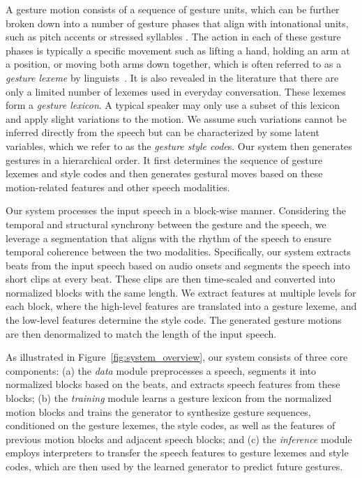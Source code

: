 \documentclass[acmtog,authorversion]{acmart}
\newcommand{\fig}{Figure{}~}
\begin{document}
A gesture motion consists of a sequence of gesture units, which can be further broken down into a number of gesture phases that align with intonational units, such as pitch accents or stressed syllables \cite{kendon2004GestureBook,Loehr2012Temporal}. The action in each of these gesture phases is typically a specific movement such as lifting a hand, holding an arm at a position, or moving both arms down together, which is often referred to as a \emph{gesture lexeme} by linguists~\cite{Neff2008Gesture,Kipp2004_Gesture,Webb1996_Linguistic}. It is also revealed in the literature that there are only a limited number of lexemes used in everyday conversation. These lexemes form a \emph{gesture lexicon}. A typical speaker may only use a subset of this lexicon and apply slight variations to the motion. We assume such variations cannot be inferred directly from the speech but can be characterized by some latent variables, which we refer to as the \emph{gesture style code}s. Our system then generates gestures in a hierarchical order. It first determines the sequence of gesture lexemes and style codes and then generates gestural moves based on these motion-related features and other speech modalities.

Our system processes the input speech in a block-wise manner. Considering the temporal and structural synchrony between the gesture and the speech, we leverage a segmentation that aligns with the rhythm of the speech to ensure temporal coherence between the two modalities. Specifically, our system extracts beats from the input speech based on audio onsets and segments the speech into short clips at every beat. These clips are then time-scaled and converted into normalized blocks with the same length. We extract features at multiple levels for each block, where the high-level features are translated into a gesture lexeme, and the low-level features determine the style code. The generated gesture motions are then denormalized to match the length of the input speech.

As illustrated in \fig\ref{fig:system_overview}, our system consists of three core components: (a) the \emph{data} module preprocesses a speech, segments it into normalized blocks based on the beats, and extracts speech features from these blocks; (b) the \emph{training} module learns a gesture lexicon from the normalized motion blocks and trains the generator to synthesize gesture sequences, conditioned on the gesture lexemes, the style codes, as well as the features of previous motion blocks and adjacent speech blocks; and (c) the \emph{inference} module employs interpreters to transfer the speech features to gesture lexemes and style codes, which are then used by the learned generator to predict future gestures.
\end{document}
